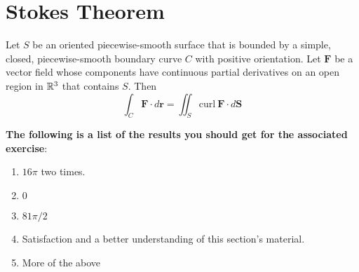 \documentclass[12pt]{exam}
\newcommand{\qdate}{Stokes Theorem} %
\begin{document}
\section*{\qdate}


\begin{theorem}
    Let \(S\) be an oriented piecewise-smooth surface that is bounded by a simple, closed, piecewise-smooth boundary curve \(C\) with positive orientation. Let \(\mathbf{F}\) be a vector field whose components have continuous partial derivatives on an open region in \(\mathbb{R}^3\) that contains \(S.\) Then
    \[
        \int_{C}\mathbf{F}\cdot d\bm{r} = \iint_S \mathrm{curl}~\mathbf{F}\cdot d\mathbf{S}
    \]
\end{theorem}

\noindent \textbf{The following is a list of the results you should get for the associated exercise}:
\begin{enumerate}
    \item \(16\pi\) two times.
    \item \(0\)
    \item \(81\pi/2\)
    \item Satisfaction and a better understanding of this section's material.
    \item More of the above
\end{enumerate}
\end{document}
